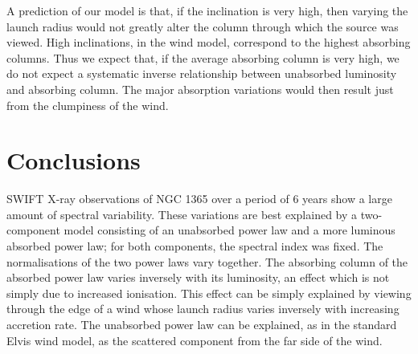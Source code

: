 \documentclass[useAMS,usenatbib]{sam}
\begin{document}


    
A prediction of our model is that, if the inclination is very high, then varying the launch radius would not greatly alter the column through which the source was
viewed. High inclinations, in the wind model, correspond to the highest absorbing columns. Thus we expect that, if the average absorbing column is very high, we do not
expect a systematic inverse relationship between unabsorbed luminosity and absorbing column. The major absorption variations would then result just from the clumpiness of
the wind.

\section{Conclusions}

SWIFT X-ray observations of NGC 1365 over a period of 6 years show a large amount of spectral variability. These variations are best explained by a two-component model
consisting of an unabsorbed power law and a more luminous absorbed power law; for both components, the spectral index was fixed. The normalisations of the two power laws
vary together. The absorbing column of the absorbed power law varies inversely with its luminosity, an effect which is not simply due to increased ionisation. This effect
can be simply explained by viewing through the edge of a wind whose launch radius varies inversely with increasing accretion rate. The unabsorbed power law can be
explained, as in the standard Elvis wind model, as the scattered component from the far side of the wind.
\end{document}
